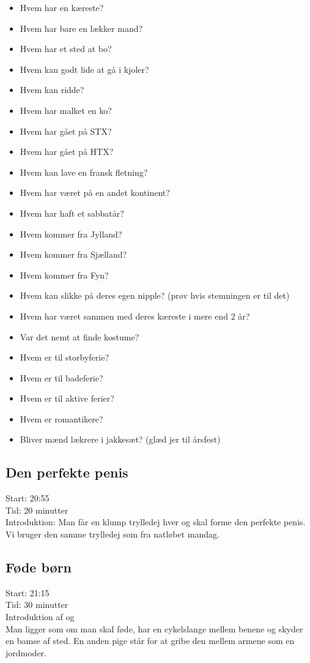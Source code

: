 \begin{itemize}
  \item Hvem har en kæreste?
  \item Hvem har bare en lækker mand?
  \item Hvem har et sted at bo?
  \item Hvem kan godt lide at gå i kjoler?
  \item Hvem kan ridde?
  \item Hvem har malket en ko?
  \item Hvem har gået på STX?
  \item Hvem har gået på HTX?
  \item Hvem kan lave en fransk fletning?
  \item Hvem har været på en andet kontinent?
  \item Hvem har haft et sabbatår?
  \item Hvem kommer fra Jylland?
  \item Hvem kommer fra Sjælland?
  \item Hvem kommer fra Fyn?
  \item Hvem kan slikke på deres egen nipple? (prøv hvis stemningen er til det)
  \item Hvem har været sammen med deres kæreste i mere end 2 år?
  \item Var det nemt at finde kostume?
  \item Hvem er til storbyferie?
  \item Hvem er til badeferie?
  \item Hvem er til aktive ferier?
  \item Hvem er romantikere?
  \item Bliver mænd lækrere i jakkesæt? (glæd jer til årsfest)
\end{itemize}

\subsection*{Den perfekte penis}
Start: 20:55\\
Tid: 20 minutter\\
Introduktion: \randildo
Man får en klump trylledej hver og skal forme den perfekte penis.\\
Vi bruger den samme trylledej som fra natløbet mandag.\\

\subsection*{Føde børn}
Start: 21:15 \\
Tid: 30 minutter \\
Introduktion af \hspace{.1em} og\hspace{.2em}  \\
Man ligger som om man skal føde, har en cykelslange mellem benene og skyder en bamse af sted. En anden pige står for at gribe den mellem armene som en jordmoder. 

